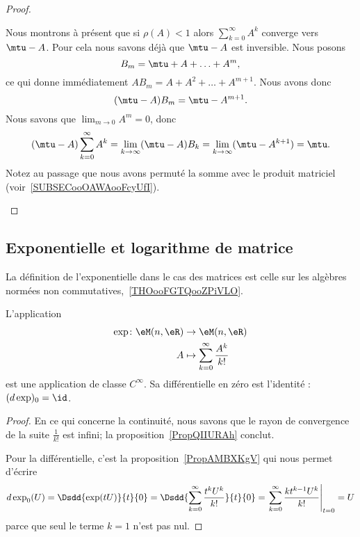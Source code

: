 \begin{proof}
\begin{subproof}
		\spitem[Le reste]
		Nous montrons à présent que si \( \rho(A)<1\) alors \( \sum_{k=0}^{\infty}A^k\) converge vers \(\mtu-A\). Pour cela nous savons déjà que \( \mtu-A\) est inversible. Nous posons
		\begin{equation}
			B_m=\mtu+A+\ldots +A^m,
		\end{equation}
		ce qui donne immédiatement \( AB_m=A+A^2+\ldots +A^{m+1}\). Nous avons donc
		\begin{equation}
			(\mtu-A)B_m=\mtu-A^{m+1}.
		\end{equation}
		Nous savons que \( \lim_{m\to0}A^m=0\), donc
		\begin{equation}
			(\mtu-A)\sum_{k=0}^{\infty}A^k=\lim_{k\to \infty} (\mtu-A)B_k=\lim_{k\to \infty} (\mtu-A^{k+1})=\mtu.
		\end{equation}
		Notez au passage que nous avons permuté la somme avec le produit matriciel (voir~\ref{SUBSECooOAWAooFcyUfI}).
	\end{subproof}
\end{proof}

\subsection{Exponentielle et logarithme de matrice}
\label{subsecXNcaQfZ}

La définition de l'exponentielle dans le cas des matrices est celle sur les algèbres normées non commutatives,~\ref{THOooFGTQooZPiVLO}.
\begin{proposition} \label{PropXFfOiOb}
	L'application
	\begin{equation}
		\begin{aligned}
			\exp\colon \eM(n,\eR) & \to \eM(n,\eR)                                \\
			A                     & \mapsto \sum_{k=0}^{\infty}\frac{ A^k }{ k! }
		\end{aligned}
	\end{equation}
	est une application de classe \(  C^{\infty}\). Sa différentielle en zéro est l'identité : \( (d\exp)_0=\id\).
\end{proposition}

\begin{proof}
	En ce qui concerne la continuité, nous savons que le rayon de convergence de la suite \( \frac{1}{ k! }\) est infini; la proposition~\ref{PropQIIURAh} conclut.

	Pour la différentielle, c'est la proposition~\ref{PropAMBXKgV} qui nous permet d'écrire
	\begin{equation}
		d\exp_0(U)=\Dsdd{ \exp(tU) }{t}{0}=\Dsdd{ \sum_{k=0}^{\infty}\frac{ t^kU^k }{ k! } }{t}{0}=\left. \sum_{k=0}^{\infty}\frac{ kt^{k-1}U^k }{ k! }\right|_{t=0}=U
	\end{equation}
	parce que seul le terme \( k=1\) n'est pas nul.
\end{proof}

